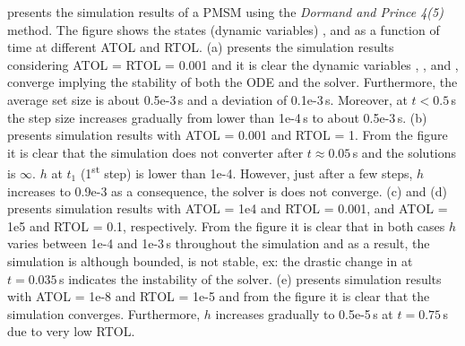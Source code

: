  presents the simulation results of a PMSM using the \textit{Dormand and Prince 4(5)} method. The figure shows the states (dynamic variables) \id, \iq and \wm as a function of time at different ATOL and RTOL. (a) presents the simulation results considering ATOL = RTOL = 0.001 and it is clear the dynamic variables \id, \iq, and \wm, converge implying the stability of both the ODE and the solver. Furthermore, the average set size is about 0.5e-3\,s and a deviation of 0.1e-3\,s. Moreover, at $t < 0.5$\,s the step size increases gradually from lower than 1e-4\,s to about 0.5e-3\,s. (b) presents simulation results with ATOL = 0.001 and RTOL = 1. From the figure it is clear that the simulation does not converter after $t \approx 0.05$\,s and the solutions is $\infty$. $h$ at $t_1$ (1\textsuperscript{st} step) is lower than 1e-4. However, just after a few steps, $h$ increases to 0.9e-3 as a consequence, the solver is does not converge. (c) and (d) presents simulation results with ATOL = 1e4 and RTOL = 0.001, and ATOL = 1e5 and RTOL = 0.1, respectively. From the figure it is clear that in both cases $h$ varies between 1e-4 and 1e-3\,s throughout the simulation and as a result, the simulation is although bounded, is not stable, ex: the drastic change in \wm at $t = 0.035$\,s indicates the instability of the solver. (e) presents simulation results with ATOL = 1e-8 and RTOL = 1e-5 and from the figure it is clear that the simulation converges. Furthermore, $h$ increases gradually to 0.5e-5\,s at $t = 0.75$\,s due to very low RTOL. 

%

